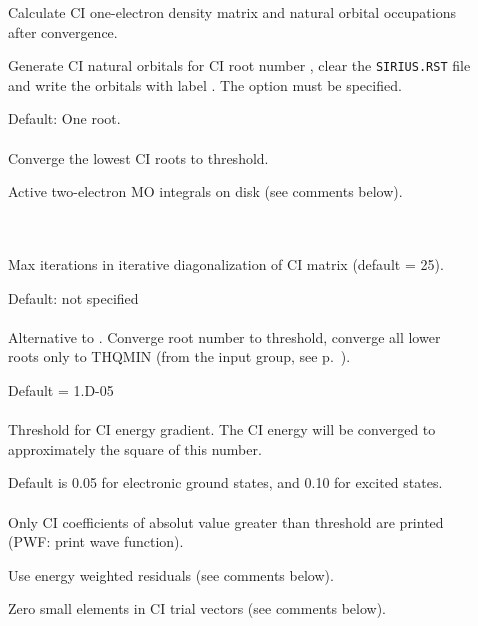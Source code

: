 \begin{description}
\item[]
  Calculate CI one-electron density matrix and natural
  orbital
  occupations after convergence.

\item[]
  Generate CI natural
  orbitals for CI root
  number ,
  clear the \verb|SIRIUS.RST| file and write the orbitals with label .
  The  option must be specified.

\item[]
  Default: One root.\\
   \\
  Converge the lowest  CI roots to threshold.

\item[]
  Active two-electron MO integrals on disk (see comments below).

\item[] \ \\
   \\
  Max iterations in iterative diagonalization of CI matrix (default = 25).

\item[]
  Default: not specified\\
   \\
  Alternative to .  Converge root number 
  to threshold, converge all lower roots only to THQMIN
  (from the  input group, see
  p.~\pageref{ref-optinp}).

\item[]
  Default = 1.D-05\\
   \\
  Threshold for CI energy gradient.  The CI energy will be converged to
  approximately the square of this number.

\item[]
  Default is 0.05 for electronic ground states, and 0.10 for excited states.\\
   \\
  Only CI coefficients of absolut value greater than threshold are printed
  (PWF: print wave function).

\item[]
  Use energy weighted residuals (see comments below).

\item[]
  Zero small elements in CI trial vectors (see comments below).
\end{description}


